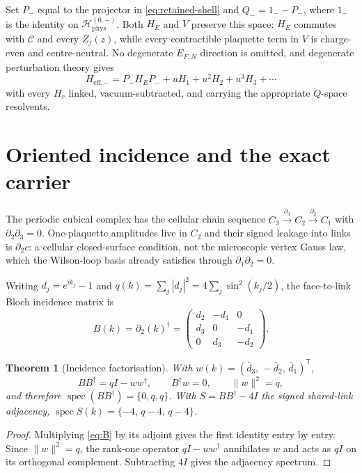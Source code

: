 \documentclass[11pt]{article}
\theoremstyle{plain}
\newtheorem{theorem}{Theorem}
\theoremstyle{definition}
\theoremstyle{remark}
\newcommand{\chk}[1]{}
\newcommand{\dg}{^{\dagger}}
\begin{document}
Set $P_-$ equal to the projector in \eqref{eq:retained-shell} and
$Q_-=1_--P_-$, where $1_-$ is the identity on
$\mathcal H_{\mathrm{phys}}^{(0,-)}$. Both $H_E$ and $V$ preserve this space:
$H_E$ commutes with $\mathcal C$ and every $Z_j(z)$, while every contractible
plaquette term in $V$ is charge-even and centre-neutral. No degenerate
$E_{F,N}$ direction is omitted, and degenerate
perturbation theory gives
\begin{equation}\label{eq:heff}
  H_{\mathrm{eff},-}=P_-H_EP_-+uH_1+u^2H_2+u^3H_3+\cdots
\end{equation}
with every $H_r$ linked, vacuum-subtracted, and carrying the appropriate
$Q$-space resolvents.

\section{Oriented incidence and the exact carrier}
\label{sec:carrier}

The periodic cubical complex has the cellular chain sequence
$C_3\xrightarrow{\partial_3}C_2\xrightarrow{\partial_2}C_1$ with
$\partial_2\partial_3=0$. One-plaquette amplitudes live in $C_2$ and their
signed leakage into links is $\partial_2c$: a cellular closed-surface
condition, not the microscopic vertex Gauss law, which the Wilson-loop basis
already satisfies through $\partial_1\partial_2=0$.

Writing $d_j=e^{ik_j}-1$ and $q(k)=\sum_j|d_j|^2=4\sum_j\sin^2(k_j/2)$, the
face-to-link Bloch incidence matrix is
\begin{equation}\label{eq:B}
  B(k)=\partial_2(k)\dg=
  \begin{pmatrix}
    d_2 & -d_1 & 0\\
    d_3 & 0 & -d_1\\
    0 & d_3 & -d_2
  \end{pmatrix}.
\end{equation}

\begin{theorem}[Incidence factorisation]\label{thm:fact}
With $w(k)=(\bar d_3,\,-\bar d_2,\,\bar d_1)^{\mathsf T}$,
\[
  BB\dg=qI-ww\dg,\qquad B\dg w=0,\qquad \|w\|^2=q,
\]
and therefore $\operatorname{spec}(BB\dg)=\{0,q,q\}$. With
$S=BB\dg-4I$ the signed shared-link adjacency,
$\operatorname{spec}S(k)=\{-4,\,q-4,\,q-4\}$.
\end{theorem}

\begin{proof}
Multiplying \eqref{eq:B} by its adjoint gives the first identity entry by
entry. Since $\|w\|^2=q$, the rank-one operator $qI-ww\dg$ annihilates $w$ and
acts as $qI$ on its orthogonal complement. Subtracting $4I$ gives the
adjacency spectrum.
\end{proof}
\chk{B B\^{}dagger = q I - d conj(d)\^{}T for the curl incidence}
\end{document}

